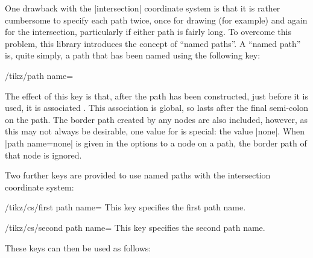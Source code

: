   One drawback with the |intersection| coordinate system is that
  it is rather cumbersome to specify each path twice, once for drawing
  (for example) and again for the intersection, particularly if
  either path is fairly long. To overcome this problem, this library 
  introduces the concept of ``named paths''. A ``named path'' is, 
  quite simply, a path that has been named using the following key:
  
\begin{key}{/tikz/path name=}

	The effect of this key is that, after the path has been constructed,
  just before it is used, it is associated . This 
  association is global, so lasts after the final semi-colon on the
  path.  
  The border path created by any nodes are also included, however,
  as this may not always be desirable, one value for  
  is special: the value |none|. When |path name=none| is given 
  in the options to a node on a path, the border path of that node 
  is ignored. 

\begin{codeexample}[]
\end{codeexample}

 
\end{key}

  Two further keys are provided to use named paths with the
  intersection coordinate system:
  
\begin{key}{/tikz/cs/first path name=}
  This key specifies the first path name.
\end{key}

\begin{key}{/tikz/cs/second path name=}
  This key specifies the second path name.
\end{key}

These keys can then be used as follows:
  
\begin{codeexample}[]
\end{codeexample}

